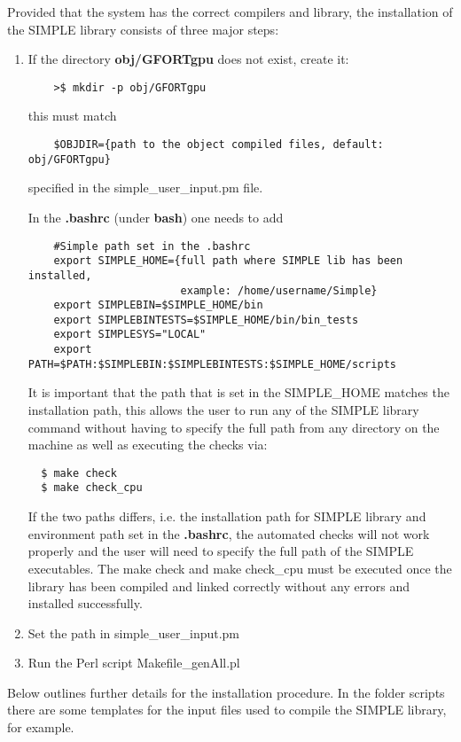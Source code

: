 \documentclass[review]{elsarticle}
\begin{document}
Provided that the system has the correct compilers and library, the
installation of the SIMPLE library consists of three major steps:
\begin{enumerate}
\item If the directory {\bf{obj/GFORTgpu}} does not exist, create it:
\begin{verbatim}
    >$ mkdir -p obj/GFORTgpu
\end{verbatim}
this must match
\begin{verbatim}
    $OBJDIR={path to the object compiled files, default: obj/GFORTgpu}
\end{verbatim}
specified in the simple\_user\_input.pm file.

In the {\bf{.bashrc}} (under {\bf{bash}}) one needs to add 
\begin{verbatim}
    #Simple path set in the .bashrc 
    export SIMPLE_HOME={full path where SIMPLE lib has been installed,
                        example: /home/username/Simple}
    export SIMPLEBIN=$SIMPLE_HOME/bin
    export SIMPLEBINTESTS=$SIMPLE_HOME/bin/bin_tests
    export SIMPLESYS="LOCAL"
    export PATH=$PATH:$SIMPLEBIN:$SIMPLEBINTESTS:$SIMPLE_HOME/scripts
\end{verbatim}

It is important that the path that is set in the SIMPLE\_HOME matches
the installation path, this allows the user to run any of the SIMPLE
library command without having to specify the full path from any
directory on the machine as well as executing the checks via:
\begin{verbatim}
  $ make check
  $ make check_cpu
\end{verbatim}

If the two paths differs, i.e. the installation path for SIMPLE
library and environment path set in the {\bf{.bashrc}}, the
automated checks will not work properly and the user will need to
specify the full path of the SIMPLE executables. The make check and make
check\_cpu must be executed once the library has been compiled and
linked correctly without any errors and installed successfully.

\item Set the path in simple\_user\_input.pm
\item Run the Perl script Makefile\_genAll.pl

\end{enumerate}

Below outlines further details for the installation procedure. In
the folder scripts there are some templates for the input files used to
compile the SIMPLE library, for example.
\end{document}
